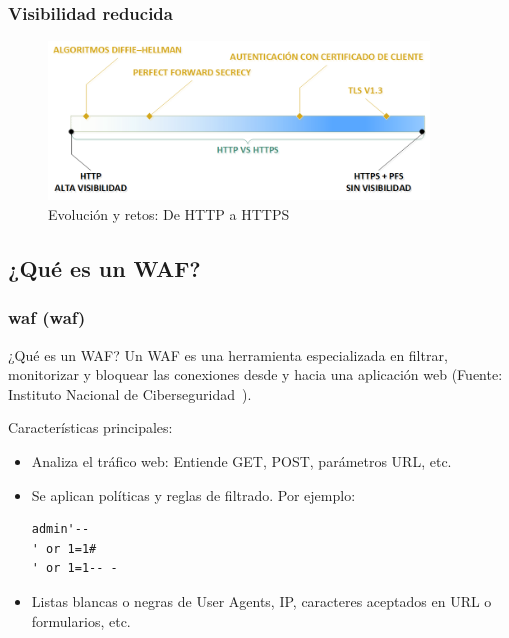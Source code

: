 \begin{frame}[shrink=20]
  \frametitle{Visibilidad reducida}
    \begin{figure}[c]
			\includegraphics[width=0.9\textwidth]{fig/TLS_Visibility}
      \caption{\small{Evolución y retos: De HTTP a HTTPS}}
		\end{figure}
\end{frame}

\subsection{¿Qué es un WAF?}
\begin{frame}[shrink=20,fragile]
  \frametitle{\acrlong{waf} (\acrshort{waf})}
  \begin{exampleblock}{¿Qué es un WAF?}
    Un WAF es una herramienta especializada en filtrar, monitorizar y bloquear las conexiones desde y hacia una aplicación web (Fuente: Instituto Nacional de Ciberseguridad~\cite{incibewaf}).
  \end{exampleblock}
  Características principales:
  \begin{itemize}
    \item Analiza el tráfico web: Entiende GET, POST, parámetros URL, etc.
    \item Se aplican políticas y reglas de filtrado. Por ejemplo:
        \begin{lstlisting}
admin'--
' or 1=1#
' or 1=1-- -
        \end{lstlisting}
    \item Listas blancas o negras de User Agents, IP, caracteres aceptados en URL o formularios, etc.
  \end{itemize}
\end{frame}

